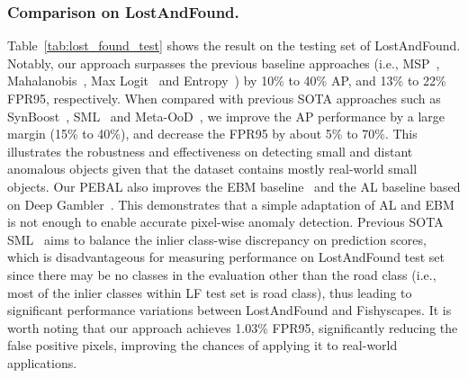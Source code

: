 \documentclass[runningheads]{llncs}
\begin{document}
\vspace{-5pt}
\subsubsection{Comparison on LostAndFound.}
Table~\ref{tab:lost_found_test} shows the result on the testing set of LostAndFound. Notably, our approach surpasses the previous baseline approaches (i.e., MSP~\cite{hendrycks2019scaling}, Mahalanobis~\cite{lee2018simple}, Max Logit~\cite{hendrycks2016baseline} and Entropy~\cite{hendrycks2016baseline}) by 10\% to 40\% AP, and 13\% to 22\% FPR95, respectively. 
When compared with previous SOTA approaches such as SynBoost~\cite{di2021pixel}, SML~\cite{jung2021standardized} and Meta-OoD~\cite{chan2021entropy}, we improve the AP performance by a large margin (15\% to 40\%), and decrease the FPR95 by about 5\% to 70\%. This illustrates the robustness and effectiveness on detecting small and distant anomalous objects given that the dataset contains mostly real-world small objects. 
Our PEBAL also improves the EBM baseline~\cite{liu2020energy} and the AL baseline based on Deep Gambler~\cite{liu2019deep}. This demonstrates that a simple adaptation of AL and EBM is not enough to enable accurate pixel-wise anomaly detection. Previous SOTA SML~\cite{jung2021standardized} aims to balance the inlier class-wise discrepancy on prediction scores, which is disadvantageous for measuring performance on LostAndFound test set since there may be no classes in the evaluation other than the road class (i.e., most of the inlier classes within LF test set is road class), thus leading to significant performance variations between LostAndFound and Fishyscapes. 
It is worth noting that our approach achieves 1.03\% FPR95, significantly reducing the false positive pixels, improving the chances of applying it to real-world applications. 











\vspace{-10pt}
\end{document}
